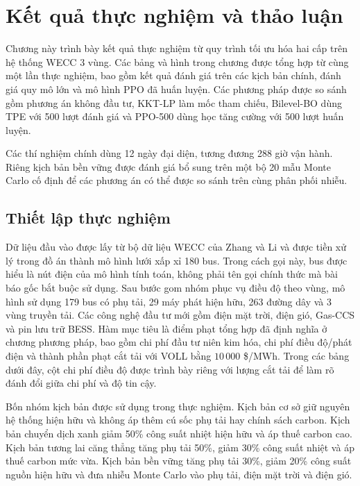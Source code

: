 \chapter{Kết quả thực nghiệm và thảo luận}
\label{chap:results}

\captionsetup[subfigure]{font=small}

Chương này trình bày kết quả thực nghiệm từ quy trình tối ưu hóa hai cấp trên hệ thống WECC 3 vùng. Các bảng và hình trong chương được tổng hợp từ cùng một lần thực nghiệm, bao gồm kết quả đánh giá trên các kịch bản chính, đánh giá quy mô lớn và mô hình PPO đã huấn luyện. Các phương pháp được so sánh gồm phương án không đầu tư, KKT-LP làm mốc tham chiếu, Bilevel-BO dùng TPE với 500 lượt đánh giá và PPO-500 dùng học tăng cường với 500 lượt huấn luyện.

Các thí nghiệm chính dùng 12 ngày đại diện, tương đương 288 giờ vận hành. Riêng kịch bản bền vững được đánh giá bổ sung trên một bộ 20 mẫu Monte Carlo cố định để các phương án có thể được so sánh trên cùng phân phối nhiễu.

\section{Thiết lập thực nghiệm}

Dữ liệu đầu vào được lấy từ bộ dữ liệu WECC của Zhang và Li \cite{zhang2023dataset} và được tiền xử lý trong đồ án thành mô hình lưới xấp xỉ 180 bus. Trong cách gọi này, bus được hiểu là nút điện của mô hình tính toán, không phải tên gọi chính thức mà bài báo gốc bắt buộc sử dụng. Sau bước gom nhóm phục vụ điều độ theo vùng, mô hình sử dụng 179 bus có phụ tải, 29 máy phát hiện hữu, 263 đường dây và 3 vùng truyền tải. Các công nghệ đầu tư mới gồm điện mặt trời, điện gió, Gas-CCS và pin lưu trữ BESS. Hàm mục tiêu là điểm phạt tổng hợp đã định nghĩa ở chương phương pháp, bao gồm chi phí đầu tư niên kim hóa, chi phí điều độ/phát điện và thành phần phạt cắt tải với VOLL bằng $10\,000$ \$/MWh. Trong các bảng dưới đây, cột chi phí điều độ được trình bày riêng với lượng cắt tải để làm rõ đánh đổi giữa chi phí và độ tin cậy.

Bốn nhóm kịch bản được sử dụng trong thực nghiệm. Kịch bản cơ sở giữ nguyên hệ thống hiện hữu và không áp thêm cú sốc phụ tải hay chính sách carbon. Kịch bản chuyển dịch xanh giảm 50\% công suất nhiệt hiện hữu và áp thuế carbon cao. Kịch bản tương lai căng thẳng tăng phụ tải 50\%, giảm 30\% công suất nhiệt và áp thuế carbon mức vừa. Kịch bản bền vững tăng phụ tải 30\%, giảm 20\% công suất nguồn hiện hữu và đưa nhiễu Monte Carlo vào phụ tải, điện mặt trời và điện gió.

